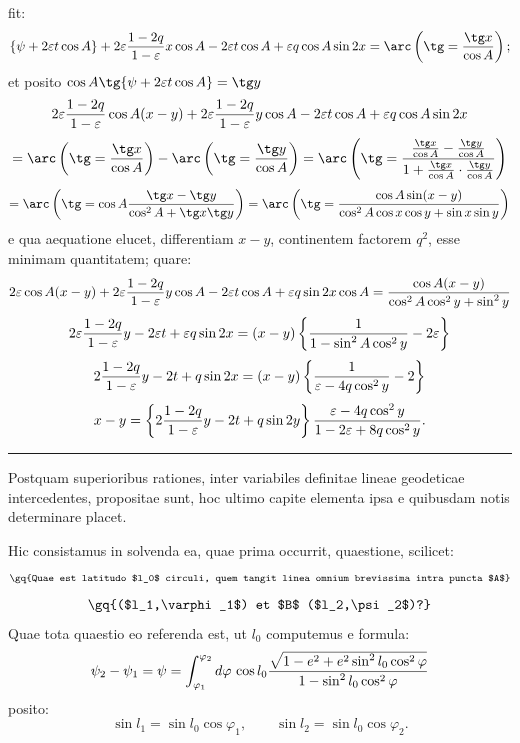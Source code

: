 \begingroup\small
fit:
\[
 \{\psi+2\varepsilon t\cos A\}+2\varepsilon{1-2q\over1-\varepsilon}x\cos A-2\varepsilon t\cos A
 +\varepsilon q\cos A\sin2x
 =\arc\left(\tg={\tg x\over\cos A}\right);
\]
et posito $\cos A\tg\{\psi+2\varepsilon t\cos A\}=\tg y$
\[
 2\varepsilon{1-2q\over1-\varepsilon}\cos A(x-y)+2\varepsilon{1-2q\over1-\varepsilon}y\cos A-2\varepsilon t\cos A+\varepsilon q\cos A\sin2x
\]
\[
=\arc\left(\tg={\tg x\over\cos A}\right)-\arc\left(\tg={\tg y\over\cos A}\right)
=\arc\left(\tg={ {\tg x\over\cos A}-{\tg y\over\cos A}\over 1+{\tg x\over\cos A}\cdot{\tg y\over\cos A}}\right)
\]
\[
=\arc\left(\tg=\cos A{\tg x-\tg y\over \cos^2 A+\tg x\tg y}\right)
=\arc\left(\tg={\cos A\sin(x-y)\over \cos^2A\cos x\cos y+\sin x\sin y}\right)
\]
e qua aequatione elucet, differentiam $x-y$, continentem factorem $q^2$, esse minimam quantitatem; quare:
\[
2\varepsilon\cos A(x-y)+2\varepsilon{1-2q\over1-\varepsilon}y\cos A-2\varepsilon t\cos A+\varepsilon q\sin2x\cos A
={\cos A(x-y)\over \cos^2A\cos^2y+\sin^2y}
\]
\[
2\varepsilon{1-2q\over1-\varepsilon}y-2\varepsilon t+\varepsilon q\sin2x
=(x-y)\left\{{1\over1-\sin^2A\cos^2y}-2\varepsilon\right\}
\]
\[
2{1-2q\over1-\varepsilon}y-2t+q\sin2x
=(x-y)\left\{{1\over\varepsilon-4q\cos^2y}-2\right\}
\]
\[
 x-y=\left\{2{1-2q\over1-\varepsilon}y-2t+q\sin2y\right\}{\varepsilon-4q\cos^2y\over1-2\varepsilon+8q\cos^2y}.
\]

\rule{0.35\textwidth}{0.4pt}


Postquam superioribus rationes, inter variabiles definitae lineae geodeticae intercedentes, propositae sunt, hoc ultimo capite elementa ipsa e quibusdam notis determinare placet.

Hic consistamus in solvenda ea, quae prima occurrit, quaestione, scilicet:
\[
\text{\gq{Quae est latitudo $l_0$ circuli, quem tangit linea omnium brevissima intra puncta $A$}}
\]
\[
\text{\gq{($l_1,\varphi_1$) et $B$ ($l_2,\psi_2$)?}}
\]
Quae tota quaestio eo referenda est, ut $l_0$ computemus e formula:
\[
 \psi_2-\psi_1=\psi=\int_{\varphi_1}^{\varphi_2} d\varphi\,\cos l_0
{\sqrt{1-e^2+e^2\sin^2 l_0\cos^2\varphi}\over1-\sin^2 l_0\cos^2\varphi}
\]
posito:
\[
 \sin l_1=\sin l_0\cos\varphi_1,
 \qquad
 \sin l_2=\sin l_0\cos\varphi_2.
\]
\endgroup
